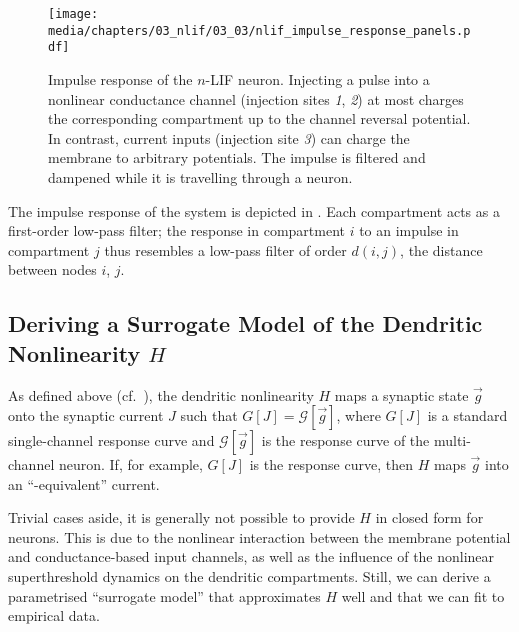 \begin{figure}
	\texttt{[image: media/chapters/03\_nlif/03\_03/nlif\_impulse\_response\_panels.pdf]}
	\label{fig:nlif_impulse_response_panels}
	\caption[Impulse response of the $n$-LIF neuron]{Impulse response of the $n$-LIF neuron.
	Injecting a pulse into a nonlinear conductance channel (injection sites \emph{1}, \emph{2}) at most charges the corresponding compartment up to the channel reversal potential.
	In contrast, current inputs (injection site \emph{3}) can charge the membrane to arbitrary potentials.
	The impulse is filtered and dampened while it is travelling through a neuron.
	}
\end{figure}
The impulse response of the system is depicted in .
Each compartment acts as a first-order low-pass filter; the response in compartment $i$ to an impulse in compartment $j$ thus resembles a low-pass filter of order $d(i, j)$, the distance between nodes $i$, $j$.

\subsection{Deriving a Surrogate Model of the Dendritic Nonlinearity $H$}
\label{sec:nlif_derive_h}

As defined above (cf.~), the dendritic nonlinearity $H$ maps a synaptic state $\vec g$ onto the synaptic current $J$ such that $G[J] = \mathscr{G}[\vec g]$, where $G[J]$ is a standard single-channel response curve and $\mathscr{G}[\vec g]$ is the response curve of the multi-channel neuron.
If, for example, $G[J]$ is the \LIF response curve, then $H$ maps $\vec g$ into an \enquote{\LIF-equivalent} current.

Trivial cases aside, it is generally not possible to provide $H$ in closed form for \nlif neurons.
This is due to the nonlinear interaction between the membrane potential and conductance-based input channels, as well as the influence of the nonlinear superthreshold dynamics on the dendritic compartments.
Still, we can derive a parametrised \enquote{surrogate model} that approximates $H$ well and that we can fit to empirical data.

